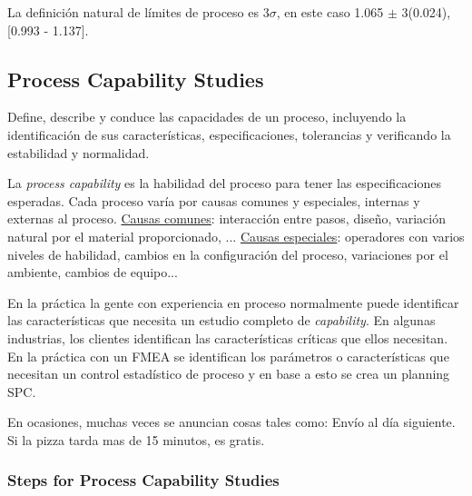 \documentclass[]{article}
\begin{document}
La definición natural de límites de proceso es 3$\sigma$, en este caso 1.065 $\pm$ 3(0.024), [0.993 - 1.137].

\subsection{Process Capability Studies}

Define, describe y conduce las capacidades de un proceso, incluyendo la identificación de sus características, especificaciones, tolerancias y verificando la estabilidad y normalidad.

La \textit{process capability} es la habilidad del proceso para tener las especificaciones esperadas. Cada proceso varía por causas comunes y especiales, internas y externas al proceso. \underline{Causas comunes}: interacción entre pasos, diseño, variación natural por el material proporcionado, ... \underline{Causas especiales}: operadores con varios niveles de habilidad, cambios en la configuración del proceso, variaciones por el ambiente, cambios de equipo...

En la práctica la gente con experiencia en proceso normalmente puede identificar las características que necesita un estudio completo de \textit{capability}. En algunas industrias, los clientes identifican las características críticas que ellos necesitan. En la práctica con un FMEA se identifican los parámetros o características que necesitan un control estadístico de proceso y en base a esto se crea un planning SPC. 

En ocasiones, muchas veces se anuncian cosas tales como: Envío al día siguiente. Si la pizza tarda mas de 15 minutos, es gratis. 

\subsubsection{Steps for Process Capability Studies}
\end{document}
